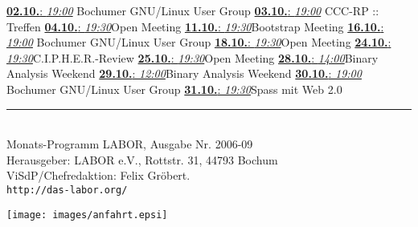 \documentclass[11pt,landscape,a4paper]{article}
\begin{document}
\begin{multicols}{3}
{\noindent\vbox{\underline{\textbf{02.10.}: \textit{19:00}}} Bochumer GNU/Linux User Group\vskip 4mm}
{\noindent\vbox{\underline{\textbf{03.10.}: \textit{19:00}}} CCC-RP :: Treffen\vskip 4mm}
{\noindent\vbox{\underline{\textbf{04.10.}: \textit{19:30}}}Open Meeting\vskip 4mm}
{\noindent\vbox{\underline{\textbf{11.10.}: \textit{19:30}}}Bootstrap Meeting\vskip 4mm}
{\noindent\vbox{\underline{\textbf{16.10.}: \textit{19:00}}} Bochumer GNU/Linux User Group\vskip 4mm}
{\noindent\vbox{\underline{\textbf{18.10.}: \textit{19:30}}}Open Meeting\vskip 4mm}
{\noindent\vbox{\underline{\textbf{24.10.}: \textit{19:30}}}C.I.P.H.E.R.-Review \vskip 4mm}
{\noindent\vbox{\underline{\textbf{25.10.}: \textit{19:30}}}Open Meeting\vskip 4mm}
{\noindent\vbox{\underline{\textbf{28.10.}: \textit{14:00}}}Binary Analysis Weekend\vskip 4mm}
{\noindent\vbox{\underline{\textbf{29.10.}: \textit{12:00}}}Binary Analysis Weekend\vskip 4mm}
{\noindent\vbox{\underline{\textbf{30.10.}: \textit{19:00}}} Bochumer GNU/Linux User Group\vskip 4mm}
{\noindent\vbox{\underline{\textbf{31.10.}: \textit{19:30}}}Spass mit Web 2.0\vskip 4mm}


\rule{0.3\linewidth}{0.25pt}\\
{\scriptsize
Monats-Programm LABOR, Ausgabe Nr. 2006-09 \\ %
Herausgeber: LABOR e.V., Rottstr. 31, 44793 Bochum \\
ViSdP/Chefredaktion: Felix Gr\"obert.\\
\verb!http://das-labor.org/!
}
\begin{center}
\centering \texttt{[image: images/anfahrt.epsi]}
\end{center}

\pagebreak


\end{multicols}
\end{document}
